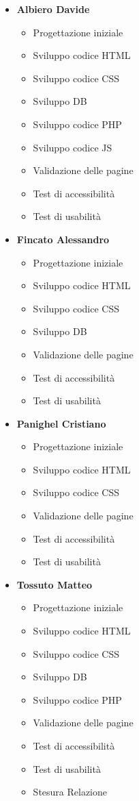 \begin{itemize}	
	\item \textbf{Albiero Davide}
	\begin{itemize}
		\item Progettazione iniziale
		\item Sviluppo codice HTML
		\item Sviluppo codice CSS
		\item Sviluppo DB
		\item Sviluppo codice PHP
		\item Sviluppo codice JS
		\item Validazione delle pagine
		\item Test di accessibilità
		\item Test di usabilità
	\end{itemize}	
	\item \textbf{Fincato Alessandro}
	\begin{itemize}
		\item Progettazione iniziale
		\item Sviluppo codice HTML
		\item Sviluppo codice CSS
		\item Sviluppo DB
		\item Validazione delle pagine
		\item Test di accessibilità
		\item Test di usabilità
	\end{itemize}	
	\item \textbf{Panighel Cristiano}
	\begin{itemize}
		\item Progettazione iniziale
		\item Sviluppo codice HTML
		\item Sviluppo codice CSS
		\item Validazione delle pagine
		\item Test di accessibilità
		\item Test di usabilità
	\end{itemize}	
	\item \textbf{Tossuto Matteo}
	\begin{itemize}
		\item Progettazione iniziale
		\item Sviluppo codice HTML
		\item Sviluppo codice CSS
		\item Sviluppo DB
		\item Sviluppo codice PHP
		\item Validazione delle pagine
		\item Test di accessibilità
		\item Test di usabilità
		\item Stesura Relazione
	\end{itemize}
\end{itemize}


